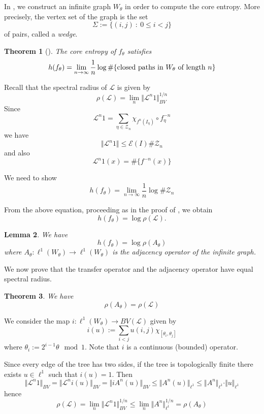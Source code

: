 \documentclass[11pt]{amsart}
\newtheorem{theorem}{Theorem}[section]
\newtheorem{lemma}[theorem]{Lemma}
\begin{document}
In \cite{Ti}, we construct an infinite graph $W_\theta$ in order to compute the core entropy. 
More precisely, the vertex set of the graph is the set 
$$\Sigma := \{ (i, j) \ : \ 0 \leq i < j \}$$
of pairs, called a \emph{wedge}. 

\begin{theorem}[\cite{Ti}]
The core entropy of $f_\theta$ satisfies 
$$h(f_\theta) = \lim_{n \to \infty} \frac{1}{n} \log \# \{ \textup{closed paths in }W_\theta \textup{ of length }n \}$$
\end{theorem}

Recall that the spectral radius of $\mathcal{L}$ is given by 
$$\rho(\mathcal{L}) = \lim_n \Vert \mathcal{L}^n 1 \Vert_{BV}^{1/n}$$
Since 
$$\mathcal{L}^n 1 = \sum_{\eta \in \mathcal{Z}_n} \chi_{f^n(I_\eta)}\circ f_\eta^{-n}$$
we have 
$$ \Vert \mathcal{L}^n 1 \Vert \leq \mathcal{E}(I) \# \mathcal{Z}_n$$
and also 
$$\mathcal{L}^n 1(x) = \#\{ f^{-n}(x) \}$$

We need to show 
\begin{equation} \label{E:count-Zn}
h(f_\theta) = \lim_{n \to \infty} \frac{1}{n} \log \# \mathcal{Z}_n
\end{equation}

From the above equation, proceeding as in the proof of \cite[Theorem 3]{Baladi-Keller}, we obtain 
$$h(f_\theta) = \log \rho(\mathcal{L}).$$

\begin{lemma}
We have 
$$h(f_\theta) = \log \rho(A_\theta)$$
where $A_\theta : \ell^1(W_\theta) \to \ell^1(W_\theta)$ is the adjacency operator of the infinite graph. 
\end{lemma}

We now prove that the transfer operator and the adjacency operator have equal spectral radius. 

\begin{theorem}
We have 
$$\rho(A_\theta) = \rho(\mathcal{L})$$
\end{theorem}

We consider the map $i : \ell^1(W_\theta) \to BV(\mathcal{L})$ given by 
$$i(u) := \sum_{i < j} u(i, j) \chi_{[\theta_i, \theta_j]}$$
where $\theta_i := 2^{i-1} \theta \mod 1$. 
Note that $i$ is a continuous (bounded) operator.


Since every edge of the tree has two sides, if the tree is topologically finite there exists $u \in \ell^1$ such that 
$i(u) = 1$.
Then 
$$\Vert \mathcal{L}^n 1 \Vert_{BV} = \Vert \mathcal{L}^n i (u) \Vert_{BV} = \Vert i A^n(u) \Vert_{BV} \leq \Vert A^n(u) \Vert_{\ell^1}
\leq \Vert A^n \Vert_{\ell^1} \cdot \Vert u \Vert_{\ell^1}$$
hence 
$$\rho(\mathcal{L}) = \lim_n \Vert \mathcal{L}^n 1 \Vert_{BV}^{1/n} \leq \lim_n  \Vert A^n \Vert_{\ell^1}^{1/n} = \rho(A_\theta)$$
\end{document}

